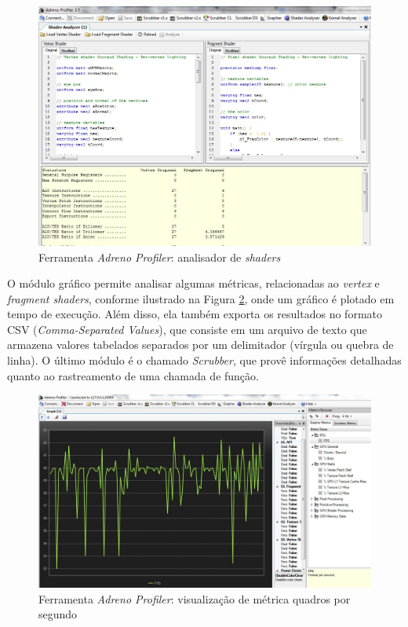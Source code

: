 	\begin{figure}[ht]
	\centering
		\includegraphics[keepaspectratio=true,scale=0.4]{figuras/shader_analyzer.jpg}
	\caption{Ferramenta \textit{Adreno Profiler}: analisador de \textit{shaders}}
	\label{adrenoProfiler}
	\end{figure}

	O módulo gráfico permite analisar algumas métricas, relacionadas ao \textit{vertex} e \textit{fragment shaders}, conforme ilustrado na Figura \ref{graph}, onde um gráfico é plotado em tempo de execução. Além disso, ela também exporta os resultados no formato CSV (\textit{Comma-Separated Values}), que consiste em um arquivo de texto que armazena valores tabelados separados por um delimitador (vírgula ou quebra de linha). O último módulo é o chamado \textit{Scrubber}, que provê informações detalhadas quanto ao rastreamento de uma chamada de função. 

	\begin{figure}[ht]
	\centering
		\includegraphics[keepaspectratio=true,scale=0.35]{figuras/graph.jpg}
	\caption{Ferramenta \textit{Adreno Profiler}: visualização de métrica quadros por segundo}
	\label{graph}
	\end{figure}

